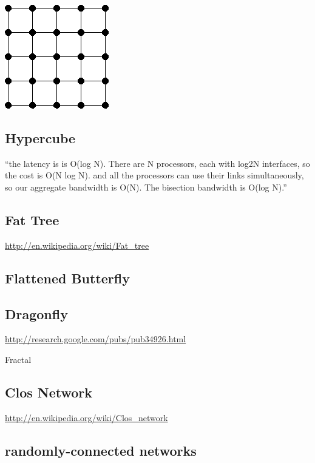 \documentclass[pdftex]{article}
\begin{document}
\includegraphics[scale=.5]{mesh.png}

\subsection{Hypercube}

``the latency is is O(log N). There are N processors, each with log2N interfaces, so the cost is O(N log N). and all the processors can use their links simultaneously, so our aggregate bandwidth is O(N). The bisection bandwidth is O(log N).''

\subsection{Fat Tree}

\href{http://en.wikipedia.org/wiki/Fat_tree}{http://en.wikipedia.org/wiki/Fat\_tree}

\subsection{Flattened Butterfly}

\subsection{Dragonfly}

\href{http://research.google.com/pubs/pub34926.html}{http://research.google.com/pubs/pub34926.html}

Fractal

\subsection{Clos Network}

\href{http://en.wikipedia.org/wiki/Clos_network}{http://en.wikipedia.org/wiki/Clos\_network}

\subsection{randomly-connected networks}
\end{document}
